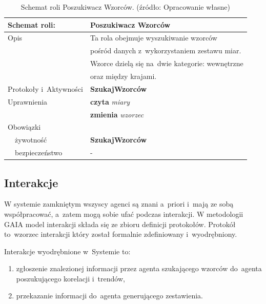 \documentclass[11pt]{report}
\begin{document}
    \begin{table}[ht!]
        \begin{tabular}{ll}
            Schemat roli:          & Poszukiwacz Wzorców                             \\ \hline
            Opis                   & Ta rola obejmuje wyszukiwanie wzorców           \\
            & pośród danych z~wykorzystaniem zestawu miar.    \\
            & Wzorce dzielą się na~dwie kategorie: wewnętrzne \\
            & oraz między krajami.                            \\
            Protokoły i~Aktywności & \textbf{SzukajWzorców}                          \\
            Uprawnienia            & \textbf{czyta} \textit{miary}                   \\
            & \textbf{zmienia} \textit{wzorzec}               \\
            Obowiązki              &                                                 \\
            ~~żywotność            & \textbf{SzukajWzorców}                          \\
            ~~bezpieczeństwo       & -                                               \\
        \end{tabular}
        \caption{Schemat roli Poszukiwacz Wzorców. (źródło: Opracowanie własne)}
        \label{tab:schemat roli Poszukiwacz Wzorców}
    \end{table}

    \subsection{Interakcje}
    W systemie zamkniętym wszyscy agenci są znani a~priori i~mają ze sobą współpracować, a~zatem mogą sobie ufać podczas interakcji.
    W metodologii GAIA model interakcji składa się ze zbioru definicji protokołów.
    Protokół to~wzorzec interakcji który został formalnie zdefiniowany i~wyodrębniony.

    Interakcje wyodrębnione w~Systemie to:

    \begin{enumerate}
        \item zgłoszenie znalezionej informacji przez agenta szukającego wzorców do~agenta poszukującego korelacji i~trendów,
        \item przekazanie informacji do~agenta generującego zestawienia.
    \end{enumerate}
\end{document}
